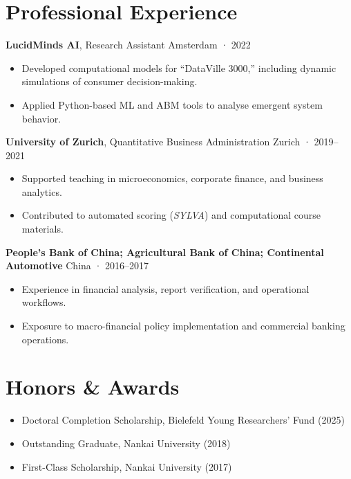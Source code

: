 \documentclass[a4paper,11pt]{article}
\begin{document}
\section{Professional Experience}

\textbf{LucidMinds AI}, Research Assistant \hfill Amsterdam · 2022  
\begin{itemize}
\item Developed computational models for “DataVille 3000,” including dynamic simulations of consumer decision-making.
\item Applied Python-based ML and ABM tools to analyse emergent system behavior.
\end{itemize}

\textbf{University of Zurich}, Quantitative Business Administration \hfill Zurich · 2019–2021  
\begin{itemize}
\item Supported teaching in microeconomics, corporate finance, and business analytics.  
\item Contributed to automated scoring (\emph{SYLVA}) and computational course materials.
\end{itemize}

\textbf{People’s Bank of China; Agricultural Bank of China; Continental Automotive} \hfill China · 2016–2017  
\begin{itemize}
\item Experience in financial analysis, report verification, and operational workflows.  
\item Exposure to macro-financial policy implementation and commercial banking operations.
\end{itemize}

\section{Honors \& Awards}

\begin{itemize}
\item Doctoral Completion Scholarship, Bielefeld Young Researchers’ Fund (2025)  
\item Outstanding Graduate, Nankai University (2018)  
\item First-Class Scholarship, Nankai University (2017)  
\end{itemize}

\end{document}
